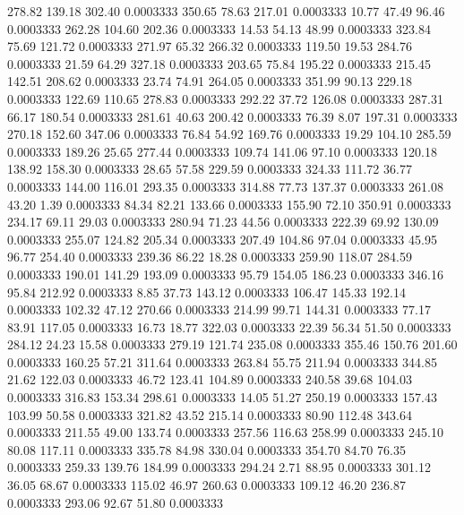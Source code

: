  278.82  139.18  302.40   0.0003333
 350.65   78.63  217.01   0.0003333
  10.77   47.49   96.46   0.0003333
 262.28  104.60  202.36   0.0003333
  14.53   54.13   48.99   0.0003333
 323.84   75.69  121.72   0.0003333
 271.97   65.32  266.32   0.0003333
 119.50   19.53  284.76   0.0003333
  21.59   64.29  327.18   0.0003333
 203.65   75.84  195.22   0.0003333
 215.45  142.51  208.62   0.0003333
  23.74   74.91  264.05   0.0003333
 351.99   90.13  229.18   0.0003333
 122.69  110.65  278.83   0.0003333
 292.22   37.72  126.08   0.0003333
 287.31   66.17  180.54   0.0003333
 281.61   40.63  200.42   0.0003333
  76.39    8.07  197.31   0.0003333
 270.18  152.60  347.06   0.0003333
  76.84   54.92  169.76   0.0003333
  19.29  104.10  285.59   0.0003333
 189.26   25.65  277.44   0.0003333
 109.74  141.06   97.10   0.0003333
 120.18  138.92  158.30   0.0003333
  28.65   57.58  229.59   0.0003333
 324.33  111.72   36.77   0.0003333
 144.00  116.01  293.35   0.0003333
 314.88   77.73  137.37   0.0003333
 261.08   43.20    1.39   0.0003333
  84.34   82.21  133.66   0.0003333
 155.90   72.10  350.91   0.0003333
 234.17   69.11   29.03   0.0003333
 280.94   71.23   44.56   0.0003333
 222.39   69.92  130.09   0.0003333
 255.07  124.82  205.34   0.0003333
 207.49  104.86   97.04   0.0003333
  45.95   96.77  254.40   0.0003333
 239.36   86.22   18.28   0.0003333
 259.90  118.07  284.59   0.0003333
 190.01  141.29  193.09   0.0003333
  95.79  154.05  186.23   0.0003333
 346.16   95.84  212.92   0.0003333
   8.85   37.73  143.12   0.0003333
 106.47  145.33  192.14   0.0003333
 102.32   47.12  270.66   0.0003333
 214.99   99.71  144.31   0.0003333
  77.17   83.91  117.05   0.0003333
  16.73   18.77  322.03   0.0003333
  22.39   56.34   51.50   0.0003333
 284.12   24.23   15.58   0.0003333
 279.19  121.74  235.08   0.0003333
 355.46  150.76  201.60   0.0003333
 160.25   57.21  311.64   0.0003333
 263.84   55.75  211.94   0.0003333
 344.85   21.62  122.03   0.0003333
  46.72  123.41  104.89   0.0003333
 240.58   39.68  104.03   0.0003333
 316.83  153.34  298.61   0.0003333
  14.05   51.27  250.19   0.0003333
 157.43  103.99   50.58   0.0003333
 321.82   43.52  215.14   0.0003333
  80.90  112.48  343.64   0.0003333
 211.55   49.00  133.74   0.0003333
 257.56  116.63  258.99   0.0003333
 245.10   80.08  117.11   0.0003333
 335.78   84.98  330.04   0.0003333
 354.70   84.70   76.35   0.0003333
 259.33  139.76  184.99   0.0003333
 294.24    2.71   88.95   0.0003333
 301.12   36.05   68.67   0.0003333
 115.02   46.97  260.63   0.0003333
 109.12   46.20  236.87   0.0003333
 293.06   92.67   51.80   0.0003333
